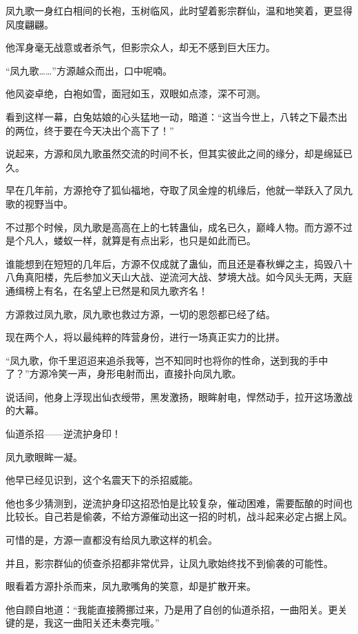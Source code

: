 
\begin{this_body}

凤九歌一身红白相间的长袍，玉树临风，此时望着影宗群仙，温和地笑着，更显得风度翩翩。

他浑身毫无战意或者杀气，但影宗众人，却无不感到巨大压力。

“凤九歌……”方源越众而出，口中呢喃。

他风姿卓绝，白袍如雪，面冠如玉，双眼如点漆，深不可测。

看到这样一幕，白兔姑娘的心头猛地一动，暗道：“这当今世上，八转之下最杰出的两位，终于要在今天决出个高下了！”

说起来，方源和凤九歌虽然交流的时间不长，但其实彼此之间的缘分，却是绵延已久。

早在几年前，方源抢夺了狐仙福地，夺取了凤金煌的机缘后，他就一举跃入了凤九歌的视野当中。

不过那个时候，凤九歌是高高在上的七转蛊仙，成名已久，巅峰人物。而方源不过是个凡人，蝼蚁一样，就算是有点出彩，也只是如此而已。

谁能想到在短短的几年后，方源不仅成就了蛊仙，而且还是春秋蝉之主，捣毁八十八角真阳楼，先后参加义天山大战、逆流河大战、梦境大战。如今风头无两，天庭通缉榜上有名，在名望上已然是和凤九歌齐名！

方源救过凤九歌，凤九歌也救过方源，一切的恩怨都已经了结。

现在两个人，将以最纯粹的阵营身份，进行一场真正实力的比拼。

“凤九歌，你千里迢迢来追杀我等，岂不知同时也将你的性命，送到我的手中了？”方源冷笑一声，身形电射而出，直接扑向凤九歌。

说话间，他身上浮现出仙衣绶带，黑发激扬，眼眸射电，悍然动手，拉开这场激战的大幕。

仙道杀招——逆流护身印！

凤九歌眼眸一凝。

他早已经见识到，这个名震天下的杀招威能。

他也多少猜测到，逆流护身印这招恐怕是比较复杂，催动困难，需要酝酿的时间也比较长。自己若是偷袭，不给方源催动出这一招的时机，战斗起来必定占据上风。

可惜的是，方源一直都没有给凤九歌这样的机会。

并且，影宗群仙的侦查杀招都非常优异，让凤九歌始终找不到偷袭的可能性。

眼看着方源扑杀而来，凤九歌嘴角的笑意，却是扩散开来。

他自顾自地道：“我能直接腾挪过来，乃是用了自创的仙道杀招，一曲阳关。更关键的是，我这一曲阳关还未奏完哦。”


\end{this_body}
